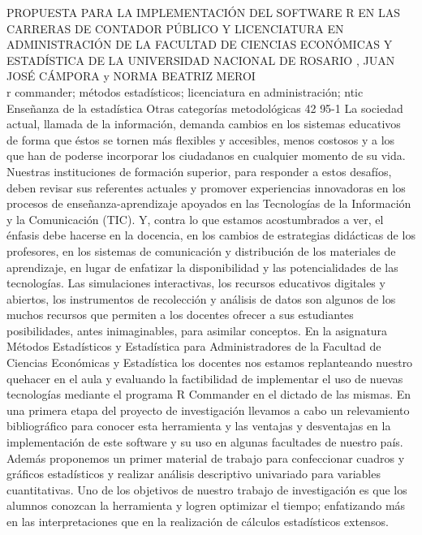 \A
{PROPUESTA PARA LA IMPLEMENTACIÓN DEL SOFTWARE R EN LAS CARRERAS DE CONTADOR PÚBLICO Y LICENCIATURA EN ADMINISTRACIÓN DE LA FACULTAD DE CIENCIAS ECONÓMICAS Y ESTADÍSTICA DE LA UNIVERSIDAD NACIONAL DE ROSARIO}
{, JUAN JOSÉ CÁMPORA y NORMA BEATRIZ MEROI}
{
\\}
{r commander; métodos estadísticos; licenciatura en administración; ntic} 
 {Enseñanza de la estadística} 
 {Otras categorías metodológicas} 
 {42} 
 {95-1}
{La sociedad actual, llamada de la información, demanda cambios en los sistemas educativos de forma que éstos se tornen más flexibles y accesibles, menos costosos y a los que han de poderse incorporar los ciudadanos en cualquier momento de su vida. Nuestras instituciones de formación superior, para responder a estos desafíos, deben revisar sus referentes actuales y promover experiencias innovadoras en los procesos de enseñanza-aprendizaje apoyados en las Tecnologías de la Información y la Comunicación (TIC). Y, contra lo que estamos acostumbrados a ver, el énfasis debe hacerse en la docencia, en los cambios de estrategias didácticas de los profesores, en los sistemas de comunicación y distribución de los materiales de aprendizaje, en lugar de enfatizar la disponibilidad y las potencialidades de las tecnologías. Las simulaciones interactivas, los recursos educativos digitales y abiertos, los instrumentos de recolección y análisis de datos son algunos de los muchos recursos que permiten a los docentes ofrecer a sus estudiantes posibilidades, antes inimaginables, para asimilar conceptos. En la asignatura Métodos Estadísticos y Estadística para Administradores de la Facultad de Ciencias Económicas y Estadística los docentes nos estamos replanteando nuestro quehacer en el aula y evaluando la factibilidad de implementar el uso de nuevas tecnologías mediante el programa R Commander en el dictado de las mismas. En una primera etapa del proyecto de investigación llevamos a cabo un relevamiento bibliográfico para conocer esta herramienta y las ventajas y desventajas en la implementación de este software y su uso en algunas facultades de nuestro país. Además proponemos un primer material de trabajo para confeccionar cuadros y gráficos estadísticos y realizar análisis descriptivo univariado para variables cuantitativas. Uno de los objetivos de nuestro trabajo de investigación es que los alumnos conozcan la herramienta y logren optimizar el tiempo; enfatizando más en las interpretaciones que en la realización de cálculos estadísticos extensos. }
